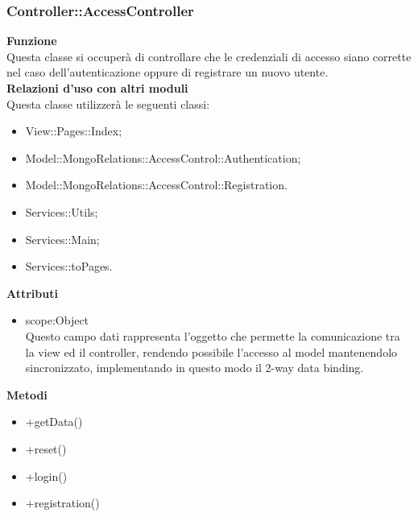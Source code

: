 {\subsubsection{Controller::AccessController}{
				\label{sub:AccessController}
				\textbf{Funzione}\\
					\indent Questa classe si occuperà di controllare che le credenziali di accesso siano corrette nel caso dell'autenticazione oppure di registrare un nuovo utente.\\
				\textbf{Relazioni d'uso con altri moduli}\\
					\indent Questa classe utilizzerà le seguenti classi:
				\begin{itemize}
					\item View::Pages::Index;
					\item Model::MongoRelations::AccessControl::Authentication;
					\item Model::MongoRelations::AccessControl::Registration.
					\item Services::Utils;
					\item Services::Main;
					\item Services::toPages.
				\end{itemize}
				\textbf{Attributi}\\
	            \begin{itemize}
	            \item scope:Object\\
	            Questo campo dati rappresenta l’oggetto che permette la comunicazione tra la view ed il controller, rendendo possibile l’accesso al model mantenendolo sincronizzato, implementando in questo modo il 2-way data binding.
	            \end{itemize}
				\textbf{Metodi}
					\begin{itemize}
                    \item +getData()
                    \item +reset()
                    \item +login()
                    \item +registration()
				\end{itemize}
			}
}
